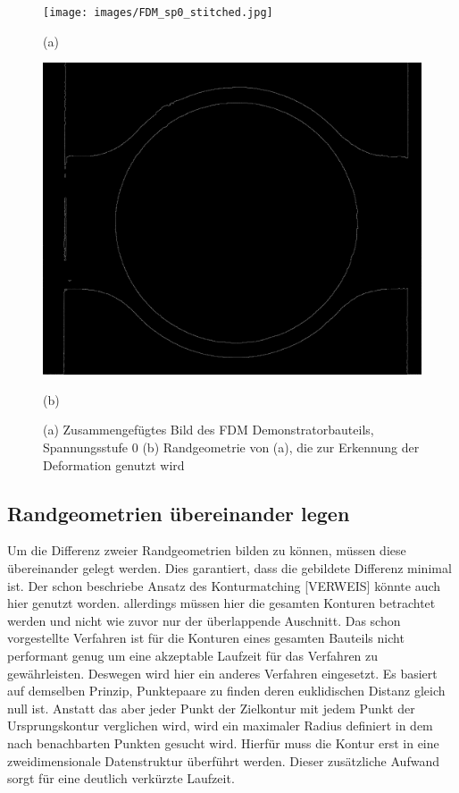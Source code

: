 \begin{figure}[H]
    \centering
    \begin{minipage}{0.49\textwidth}
        \centering
        \texttt{[image: images/FDM\_sp0\_stitched.jpg]} %
        \caption*{(a)} 
    \end{minipage}\hfill
    \begin{minipage}{0.49\textwidth}
        \centering
        \includegraphics[width=\textwidth]{images/contours_FDM_sp0_stitched.jpg} %
        \caption*{(b)}
    \end{minipage}\hfill
    \caption{(a) Zusammengefügtes Bild des FDM Demonstratorbauteils, Spannungsstufe 0
    (b) Randgeometrie von (a), die zur Erkennung der Deformation genutzt wird}
        \label{fig:stichted_contour}
\end{figure}

\subsection{Randgeometrien übereinander legen}

Um die Differenz zweier Randgeometrien bilden zu können, müssen diese übereinander 
gelegt werden.
Dies garantiert, dass die gebildete Differenz minimal ist.
Der schon beschriebe Ansatz des Konturmatching [VERWEIS] könnte auch hier genutzt worden. 
allerdings müssen hier die gesamten Konturen betrachtet werden und nicht wie zuvor nur 
der überlappende Auschnitt. Das schon vorgestellte Verfahren ist für die Konturen eines
gesamten Bauteils nicht performant genug um eine akzeptable Laufzeit für das Verfahren
zu gewährleisten. 
Deswegen wird hier ein anderes Verfahren eingesetzt. Es basiert auf demselben Prinzip,
Punktepaare zu finden deren euklidischen Distanz gleich null ist. Anstatt das aber 
jeder Punkt der Zielkontur mit jedem Punkt der Ursprungskontur verglichen wird, 
wird ein maximaler Radius definiert in dem nach benachbarten Punkten gesucht wird.
Hierfür muss die Kontur erst in eine zweidimensionale Datenstruktur überführt werden.
Dieser zusätzliche Aufwand sorgt für eine deutlich verkürzte Laufzeit.


